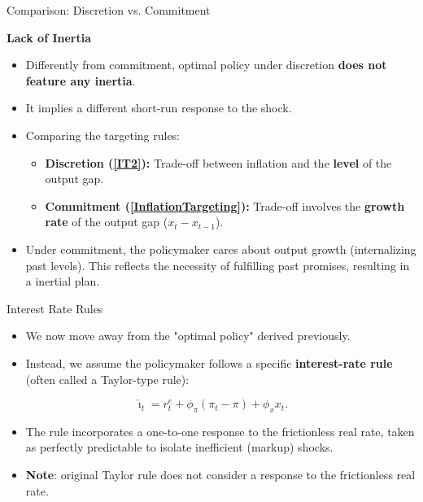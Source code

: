 \documentclass[11pt,aspectratio=169]{beamer}
\begin{document}
\begin{frame}{Comparison: Discretion vs. Commitment}
\small

\textbf{Lack of Inertia}
\begin{itemize}
    \item Differently from commitment, optimal policy under discretion \textbf{does not feature any inertia}.
    \item It implies a different short-run response to the shock.
\end{itemize}

\begin{itemize}
    \item Comparing the targeting rules:
    \begin{itemize}
        \item \textbf{Discretion (\ref{IT2}):} Trade-off between inflation and the \textbf{level} of the output gap.
        \item \textbf{Commitment (\ref{InflationTargeting}):} Trade-off involves the \textbf{growth rate} of the output gap ($x_t - x_{t-1}$).
    \end{itemize}
    \item Under commitment, the policymaker cares about output growth (internalizing past levels). This reflects the necessity of fulfilling past promises, resulting in a inertial plan.
\end{itemize}
\end{frame}

\begin{frame}{Interest Rate Rules}
\small

\begin{itemize}
\item We now move away from the "optimal policy" derived previously.
    \item Instead, we assume the policymaker follows a specific \textbf{interest-rate rule} (often called a Taylor-type rule): 
\end{itemize}

\begin{equation} \label{IRR}
\hat{\imath}_{t}
=
r_{t}^{e}
+
\phi_{\pi}(\pi_t-\pi)
+
\phi_{x}x_t.
\end{equation}

\begin{itemize}
    \item The rule incorporates a one-to-one response to the frictionless real rate, taken as perfectly predictable to isolate inefficient (markup) shocks. 
    \item \textbf{Note}: original Taylor rule does not consider a response to the frictionless real rate.
  
\end{itemize}

\end{frame}
\end{document}
